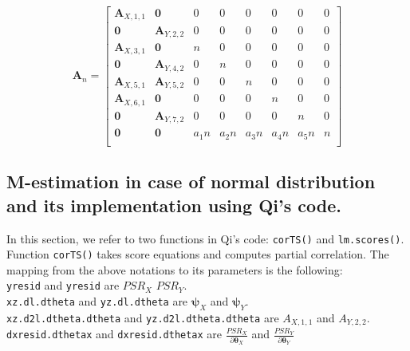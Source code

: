 \documentclass[]{article}
\begin{document}
\[
\pmb{A}_n = \begin{bmatrix}
    \pmb{A}_{X,1,1}   &    \pmb{0}     &    0     &     0 & 0 & 0 & 0 & 0\\
            \pmb{0}   &     \pmb{A}_{Y,2,2}     &    0     &     0 & 0 & 0 & 0 & 0\\
          \pmb{A}_{X, 3,1}   &     \pmb{0}     &    n     &     0 & 0 & 0 & 0 & 0\\
            \pmb{0}   & \pmb{A}_{Y, 4,2} &    0     &     n & 0 & 0 & 0 & 0\\
            \pmb{A}_{X,5,1}   &     \pmb{A}_{Y,5,2}     & 0 &    0 & n & 0 & 0 & 0\\
          \pmb{A}_{X, 6,1}   &     \pmb{0}     &    0     &     0 & 0 & n & 0 & 0\\
            \pmb{0}   & \pmb{A}_{Y, 7,2} &    0     &     0 & 0 & 0 & n & 0\\
            \pmb{0}   & \pmb{0} &    a_1n & a_2n &  a_3n & a_4n & a_5n & n\\
\end{bmatrix}
\]

\subsection{M-estimation in case of normal distribution and its implementation using Qi's code.}
In this section, we refer to two functions in Qi's code: \texttt{corTS()} and \texttt{lm.scores()}. Function  \texttt{corTS()} takes score equations and computes partial correlation. The mapping from the above notations to its parameters is the following:\\
\texttt{yresid} and \texttt{yresid} are $PSR_X$ $PSR_Y$.\\
\texttt{xz.dl.dtheta} and \texttt{yz.dl.dtheta} are $\pmb{\psi}_{X}$ and $\pmb{\psi}_{Y}$.\\
\texttt{xz.d2l.dtheta.dtheta} and \texttt{yz.d2l.dtheta.dtheta} are $A_{X,1,1}$ and $A_{Y,2,2}$.\\
\texttt{dxresid.dthetax} and \texttt{dxresid.dthetax} are $\frac{PSR_X}{\partial \pmb{\theta}_X}$ and $\frac{PSR_Y}{\partial \pmb{\theta}_Y}$\\
\end{document}
